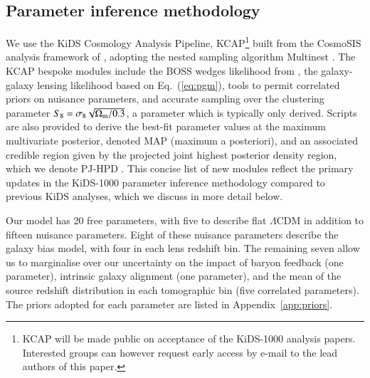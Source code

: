 \subsection{Parameter inference methodology}
\label{sec:KCAP}
We use the KiDS Cosmology Analysis Pipeline, {\sc KCAP}\footnote{KCAP will be made public on acceptance of the KiDS-1000 analysis papers.   Interested groups can however request early access by e-mail to the lead authors of this paper.} built from the {\sc CosmoSIS} analysis framework of \citet{zuntz/etal:2015}, adopting the nested sampling algorithm {\sc Multinest} \citep{feroz/hobson:2008,feroz/etal:2009,feroz/etal:2019}.  The {\sc KCAP} bespoke modules include the BOSS wedges likelihood from \citet{sanchez/etal:2017}, the galaxy-galaxy lensing likelihood based on Eq.~(\ref{eq:pgm}),  tools to permit correlated priors on nuisance parameters, and accurate sampling over the clustering parameter $S_8= \sigma_8 \sqrt{\Omega_{\rm m}/0.3}$, a parameter which is typically only derived.  Scripts are also provided to derive the best-fit parameter values at the maximum multivariate posterior, denoted MAP (maximum a posteriori), and an associated credible region given by the projected joint highest posterior density region, which we denote PJ-HPD \citep{joachimi/etal:inprep}.  
This concise list of new modules reflect the primary updates in the KiDS-1000 parameter inference methodology compared to previous KiDS analyses, which we discuss in more detail below.

Our \tttp model has 20 free parameters, with five to describe flat $\Lambda$CDM in addition to fifteen nuisance parameters.   Eight of these nuisance parameters describe the galaxy bias model, with four in each lens redshift bin. The remaining seven allow us to marginalise over our uncertainty on the impact of baryon feedback (one parameter), intrinsic galaxy alignment (one parameter), and the mean of the source redshift distribution in each tomographic bin (five correlated parameters).   The priors adopted for each parameter are listed in Appendix~\ref{app:priors}.  

